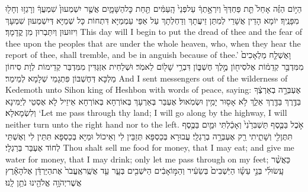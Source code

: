 {הַיּ֣וֹם הַזֶּ֗ה אָחֵל֙ תֵּ֤ת פַּחְדְּךָ֙ וְיִרְאָ֣תְךָ֔ עַל\maqqaf פְּנֵי֙ הָֽעַמִּ֔ים תַּ֖חַת כׇּל\maqqaf הַשָּׁמָ֑יִם אֲשֶׁ֤ר יִשְׁמְעוּן֙ שִׁמְעֲךָ֔ וְרָגְז֥וּ וְחָל֖וּ מִפָּנֶֽיךָ׃}
{יוֹמָא הָדֵין אֲשָׁרֵי לְמִתַּן זֵיעֲתָךְ וְדַחְלְתָךְ עַל אַפֵּי עַמְמַיָּא דִּתְחוֹת כָּל שְׁמַיָּא דְּיִשְׁמְעוּן שִׁמְעָךְ וִיזוּעוּן וְיִתַּבְרוּן מִן קֳדָמָךְ׃}
{This day will I begin to put the dread of thee and the fear of thee upon the peoples that are under the whole heaven, who, when they hear the report of thee, shall tremble, and be in anguish because of thee.’}{}
{וָאֶשְׁלַ֤ח מַלְאָכִים֙ מִמִּדְבַּ֣ר קְדֵמ֔וֹת אֶל\maqqaf סִיח֖וֹן מֶ֣לֶךְ חֶשְׁבּ֑וֹן דִּבְרֵ֥י שָׁל֖וֹם לֵאמֹֽר׃}
{וּשְׁלַחִית אִזְגַּדִּין מִמִּדְבַּר קְדֵימוֹת לְוָת סִיחוֹן מַלְכָּא דְּחֶשְׁבּוֹן פִּתְגָמֵי שְׁלָמָא לְמֵימַר׃}
{And I sent messengers out of the wilderness of Kedemoth unto Sihon king of Heshbon with words of peace, saying:}{}
{אֶעְבְּרָ֣ה בְאַרְצֶ֔ךָ בַּדֶּ֥רֶךְ בַּדֶּ֖רֶךְ אֵלֵ֑ךְ לֹ֥א אָס֖וּר יָמִ֥ין וּשְׂמֹֽאול׃}
{אֶעְבַּר בְּאַרְעָךְ בְּאוֹרְחָא בְּאוֹרְחָא אֵיזֵיל לָא אֶסְטֵי לְיַמִּינָא וְלִשְׂמָאלָא׃}
{‘Let me pass through thy land; I will go along by the highway, I will neither turn unto the right hand nor to the left.}{}
{אֹ֣כֶל בַּכֶּ֤סֶף תַּשְׁבִּרֵ֙נִי֙ וְאָכַ֔לְתִּי וּמַ֛יִם בַּכֶּ֥סֶף תִּתֶּן\maqqaf לִ֖י וְשָׁתִ֑יתִי רַ֖ק אֶעְבְּרָ֥ה בְרַגְלָֽי׃}
{עֲבוּרָא בְּכַסְפָּא תְּזַבֵּין לִי וְאֵיכוֹל וּמַיָּא בְּכַסְפָּא תִּתֵּין לִי וְאֶשְׁתֵּי לְחוֹד אֶעְבַּר בְּרַגְלָי׃}
{Thou shalt sell me food for money, that I may eat; and give me water for money, that I may drink; only let me pass through on my feet;}{}
{כַּאֲשֶׁ֨ר עָֽשׂוּ\maqqaf לִ֜י בְּנֵ֣י עֵשָׂ֗ו הַיֹּֽשְׁבִים֙ בְּשֵׂעִ֔יר וְהַמּ֣וֹאָבִ֔ים הַיֹּשְׁבִ֖ים בְּעָ֑ר עַ֤ד אֲשֶֽׁר\maqqaf אֶֽעֱבֹר֙ אֶת\maqqaf הַיַּרְדֵּ֔ן אֶל\maqqaf הָאָ֕רֶץ אֲשֶׁר\maqqaf יְהֹוָ֥ה אֱלֹהֵ֖ינוּ נֹתֵ֥ן לָֽנוּ׃}
